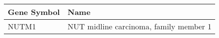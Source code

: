 \begin{tabular}{ll}
\toprule
Gene Symbol &                                   Name \\
\midrule
      NUTM1 & NUT midline carcinoma, family member 1 \\
\bottomrule
\end{tabular}
